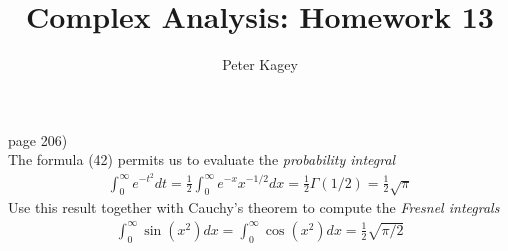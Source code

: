 \documentclass{article}
\newenvironment{problem}[2][Problem]{\begin{trivlist}
\item[\hskip \labelsep {\bfseries #1}\hskip \labelsep {\bfseries #2.}]}{\end{trivlist}}
\begin{document}
\title{Complex Analysis: Homework 13}
\author{Peter Kagey}

\maketitle

\begin{problem}{3} (page 206) \\
  The formula (42) permits us to evaluate the \textit{probability integral} \begin{align}
    \int_0^\infty e^{-t^2} dt
      = \frac{1}{2} \int_0^\infty e^{-x}x^{-1/2} dx
      = \frac{1}{2} \Gamma(1/2)
      = \frac{1}{2} \sqrt{\pi}
  \end{align}
  Use this result together with Cauchy's theorem to compute the
  \textit{Fresnel integrals} \begin{align}
    \int_0^\infty \sin(x^2) dx
    = \int_0^\infty \cos(x^2) dx
    = \frac{1}{2}\sqrt{\pi/2}
  \end{align}
\end{problem}
\end{document}
